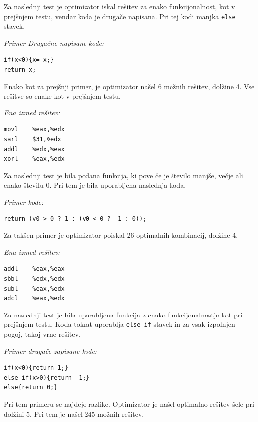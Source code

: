 \documentclass[a4paper, 12pt]{book}
\begin{document}
Za naslednji test je optimizator iskal rešitev za enako funkcijonalnost, kot v prejšnjem testu, vendar koda je drugače napisana. Pri tej kodi manjka \texttt{else} stavek.

\medskip

\noindent
{\it Primer Drugačne napisane kode:}
\begin{Verbatim}[baselinestretch=1]
if(x<0){x=-x;}
return x;
\end{Verbatim}

Enako kot za prejšnji primer, je optimizator našel 6 možnih rešitev, dolžine 4. Vse rešitve so enake kot v prejšnjem testu.

\medskip

\noindent
{\it Ena izmed rešitev:}
\begin{Verbatim}[baselinestretch=1]
movl    %eax,%edx
sarl    $31,%edx
addl    %edx,%eax
xorl    %eax,%edx
\end{Verbatim}

Za naslednji test je bila podana funkcija, ki pove če je število manjše, večje ali enako številu 0. Pri tem je bila uporabljena naslednja koda.


\medskip

\noindent
{\it Primer kode:}
\begin{Verbatim}[baselinestretch=1]
return (v0 > 0 ? 1 : (v0 < 0 ? -1 : 0));
\end{Verbatim}

Za takšen primer je optimizator poiskal 26 optimalnih kombinacij, dolžine 4.

\medskip

\noindent
{\it Ena izmed rešitev:}
\begin{Verbatim}[baselinestretch=1]
addl    %eax,%eax
sbbl    %edx,%edx
subl    %eax,%edx
adcl    %eax,%edx
\end{Verbatim}

Za naslednji test je bila uporabljena funkcija z enako funkcijonalnostjo kot pri prejšnjem testu. Koda tokrat uporablja \texttt{else if} stavek in za vsak izpolnjen pogoj, takoj vrne rešitev.


\medskip

\noindent
{\it Primer drugače zapisane kode:}
\begin{Verbatim}[baselinestretch=1]
if(x<0){return 1;}
else if(x>0){return -1;}
else{return 0;}
\end{Verbatim}

Pri tem primeru se najdejo razlike. Optimizator je našel optimalno rešitev šele pri dolžini 5. Pri tem je našel 245 možnih rešitev.
\end{document}
